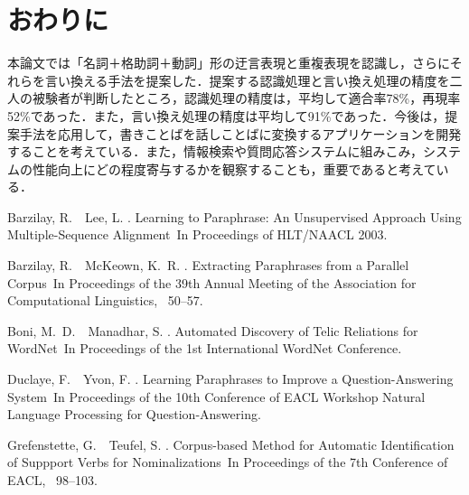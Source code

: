 \documentclass{nlp}
\begin{document}
\section{おわりに}
本論文では「名詞＋格助詞＋動詞」形の迂言表現と重複表現を認識し，さらにそ
れらを言い換える手法を提案した．提案する認識処理と言い換え処理の精度を二
人の被験者が判断したところ，認識処理の精度は，平均して適合率78\%，再現率
52\%であった．また，言い換え処理の精度は平均して91\%であった．今後は，提
案手法を応用して，書きことばを話しことばに変換するアプリケーションを開発
することを考えている．また，情報検索や質問応答システムに組みこみ，システ
ムの性能向上にどの程度寄与するかを観察することも，重要であると考えている．



\begin{thebibliography}{}

Barzilay, R.\BBACOMMA\  \BBA\ Lee, L. \BBCP.
\newblock \BBOQ Learning to Paraphrase: An Unsupervised Approach Using
  Multiple-Sequence Alignment\BBCQ\
\newblock In {\Bem Proceedings of HLT/NAACL 2003}.

Barzilay, R.\BBACOMMA\  \BBA\ McKeown, K.~R. \BBCP.
\newblock \BBOQ Extracting Paraphrases from a Parallel Corpus\BBCQ\
\newblock In {\Bem Proceedings of the 39th Annual Meeting of the Association
  for Computational Linguistics}, \BPGS\ 50--57.

Boni, M.~D.\BBACOMMA\  \BBA\ Manadhar, S. \BBOP 2002\BBCP.
\newblock \BBOQ Automated Discovery of Telic Reliations for WordNet\BBCQ\
\newblock In {\Bem Proceedings of the 1st International WordNet Conference}.

Duclaye, F.\BBACOMMA\  \BBA\ Yvon, F. \BBOP 2003\BBCP.
\newblock \BBOQ Learning Paraphrases to Improve a Question-Answering
  System\BBCQ\
\newblock In {\Bem Proceedings of the 10th Conference of EACL Workshop Natural
  Language Processing for Question-Answering}.

Grefenstette, G.\BBACOMMA\  \BBA\ Teufel, S. \BBOP 1995\BBCP.
\newblock \BBOQ Corpus-based Method for Automatic Identification of Suppport
  Verbs for Nominalizations\BBCQ\
\newblock In {\Bem Proceedings of the 7th Conference of EACL}, \BPGS\ 98--103.


\end{thebibliography}
\end{document}
